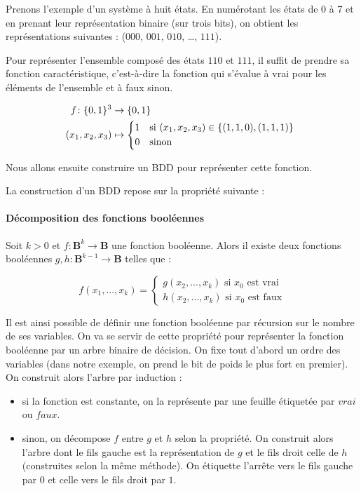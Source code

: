 Prenons l'exemple d'un système à huit états. En numérotant les états de 0 à 7 et
en prenant leur représentation binaire (sur trois bits), on obtient les
représentations suivantes : (\(000\), \(001\), \(010\), \dots, \(111\)).


Pour représenter l'ensemble composé des états \(110\) et \(111\), il suffit
de prendre sa fonction caractéristique, c'est-à-dire la fonction qui s'évalue à
vrai pour les éléments de l'ensemble et à faux sinon.

\begin{align}
  f \colon \{0, 1\}^3 & \to \{0, 1\} \\
  (x_1, x_2, x_3) & \mapsto
  \begin{cases*}
    1 & si \((x_1, x_2, x_3) \in \{(1,1,0), (1,1,1)\}\) \\
    0 & sinon
  \end{cases*}
\end{align}

Nous allons ensuite construire un BDD pour représenter cette fonction.

La construction d'un BDD repose sur la propriété suivante :

\paragraph{Décomposition des fonctions booléennes}
Soit \(k > 0\) et \(f: \mathbf{B}^k \to \mathbf{B}\) une
fonction booléenne. Alors il existe deux fonctions booléennes
\(g, h : \mathbf{B}^{k-1} \to \mathbf{B}\) telles que :

\[
f(x_1, ..., x_k) =
\begin{cases*}
  g(x_2, ..., x_k) \text{ si $x_0$ est vrai}\\
  h(x_2, ..., x_k) \text{ si $x_0$ est faux}
\end{cases*}
\]

Il est ainsi possible de définir une fonction booléenne par récursion
sur le nombre de ses variables. On va se servir de cette propriété pour
représenter la fonction booléenne par un arbre binaire de décision. On
fixe tout d'abord un ordre des variables (dans notre exemple, on prend
le bit de poids le plus fort en premier). On construit alors l'arbre
par induction :

\begin{itemize}
\item
  si la fonction est constante, on la représente par une feuille
  étiquetée par \(vrai\) ou \(faux\).
\item
  sinon, on décompose \(f\) entre \(g\) et \(h\) selon la propriété. On
  construit alors l'arbre dont le fils gauche est la représentation de
  \(g\) et le fils droit celle de \(h\) (construites selon la même méthode).
  On étiquette l'arrête vers le fils gauche par \(0\) et celle vers le fils
  droit par \(1\).
\end{itemize}

